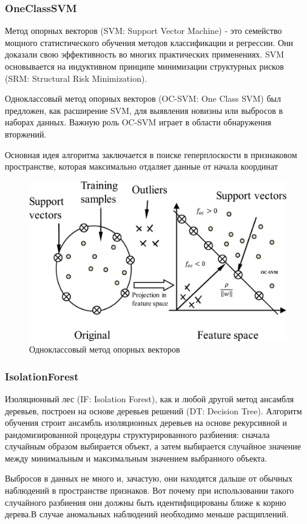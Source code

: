 \documentclass[12pt]{article}
\begin{document}
    \subsubsection{OneClassSVM}
    \label{sec:Research:Model:OneClassSVM}

    \par Метод опорных векторов (SVM: Support Vector Machine) - это семейство мощного статистического обучения методов классификации и регрессии. Они доказали свою эффективность во многих практических применениях. SVM основывается на индуктивном принципе минимизации структурных рисков (SRM: Structural Risk Minimization). \\
    \par Одноклассовый метод опорных векторов (OC-SVM: One Class SVM) был предложен, как расширение SVM, для выявления новизны или выбросов в наборах данных. Важную роль OC-SVM играет в области обнаружения вторжений. \\
    \par Основная идея алгоритма заключается в поиске геперплоскости в признаковом пространстве, которая максимально отдаляет данные от начала координат

    \begin{figure}[h]
        \centering
        \includegraphics[width=0.6\linewidth]{OneClassSVM.png}
        \caption{Одноклассовый метод опорных векторов}
        \label{sec:Research:Model:OneClassSVM:fig:OneClassSVM}
    \end{figure}
    

    \subsubsection{IsolationForest}
    \label{sec:Research:Model:IsolationForest}
    
    \par Изоляционный лес (IF: Isolation Forest), как и любой другой метод ансамбля деревьев, построен на основе деревьев решений (DT: Decision Tree). Алгоритм обучения строит ансамбль изоляционных деревьев на основе рекурсивной и рандомизированной процедуры структурированного разбиения: сначала случайным образом выбирается объект, а затем выбирается случайное значение между минимальным и максимальным значением выбранного объекта. \\
    \par Выбросов в данных не много и, зачастую, они находятся дальше от обычных наблюдений в пространстве признаков. Вот почему при использовании такого случайного разбиения они должны быть идентифицированы ближе к корню дерева.В случае аномальных наблюдений необходимо меньше расщиплений.
    
\end{document}
